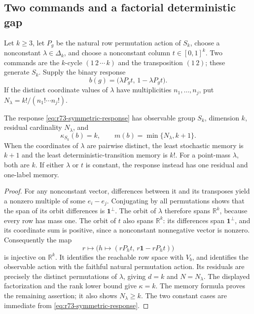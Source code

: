 \subsection{Two commands and a factorial deterministic gap}
Let $k\ge3$, let $P_g$ be the natural row permutation action of $S_k$, choose
a nonconstant $\lambda\in\Delta_k$, and choose a nonconstant column
$t\in[0,1]^k$. Two commands are the $k$-cycle $(1\,2\,\cdots\,k)$ and the
transposition $(1\,2)$; these generate $S_k$. Supply the binary response
\begin{equation}\label{eq:r73-symmetric-response}
 b(g)=\bigl(\lambda P_gt,\,1-\lambda P_gt\bigr).
\end{equation}
If the distinct coordinate values of $\lambda$ have multiplicities
$n_1,\ldots,n_j$, put $N_\lambda=k!/(n_1!\cdots n_j!)$.

\begin{proposition}\label{prop:r73-symmetric-family}
The response \eqref{eq:r73-symmetric-response} has observable group $S_k$,
dimension $k$, residual cardinality $N_\lambda$, and
\[
 \kappa_{S_k}(b)=k,\qquad
 m(b)=\min\{N_\lambda,k+1\}.
\]
When the coordinates of $\lambda$ are pairwise distinct, the least stochastic
memory is $k+1$ and the least deterministic-transition memory is $k!$.
For a point-mass $\lambda$, both are $k$. If either $\lambda$ or $t$ is
constant, the response instead has one residual and one-label memory.
\end{proposition}
\begin{proof}
For any nonconstant vector, differences between it and its transposes yield
a nonzero multiple of some $e_i-e_j$. Conjugating by all permutations shows
that the span of its orbit differences is
$\mathbf1^\perp$. The orbit of $\lambda$ therefore spans $\mathbb R^k$,
because every row has mass one. The orbit of $t$ also spans
$\mathbb R^k$: its differences span $\mathbf1^\perp$, and its coordinate
sum is positive, since a nonconstant nonnegative vector is nonzero.
Consequently the map
\[
 r\longmapsto\bigl(h\longmapsto(rP_ht,\,r\mathbf1-rP_ht)\bigr)
\]
is injective on $\mathbb R^k$. It identifies the reachable row space with
$V_b$, and identifies the observable action with the faithful natural
permutation action. Its residuals are precisely the distinct permutations
of $\lambda$, giving $d=k$ and $N=N_\lambda$. The displayed factorization
and the rank lower bound give $\kappa=k$. The memory formula proves the
remaining assertion; it also shows $N_\lambda\ge k$. The two constant
cases are immediate from \eqref{eq:r73-symmetric-response}.
\end{proof}

